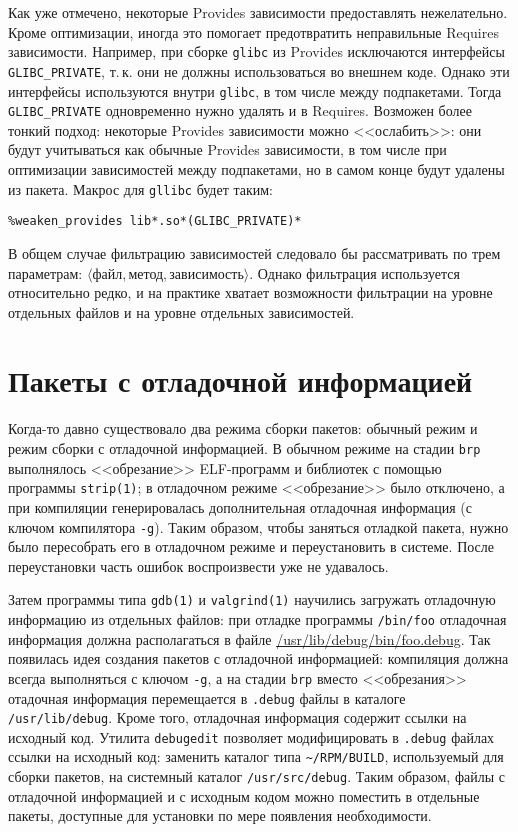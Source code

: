\documentclass[russian,a4paper,12pt,titlepage]{article}
\begin{document}
Как уже отмечено, некоторые Provides зависимости предоставлять нежелательно.  Кроме оптимизации, иногда это помогает
предотвратить неправильные Requires зависимости.  Например, при сборке \verb|glibc| из Provides исключаются интерфейсы
\verb|GLIBC_PRIVATE|, т.\,к. они не должны использоваться во внешнем коде.
Однако эти интерфейсы используются внутри \verb|glibc|, в том числе между подпакетами.  Тогда
\verb|GLIBC_PRIVATE| одновременно нужно удалять и в Requires.  Возможен более тонкий подход: некоторые Provides зависимости
можно <<ослабить>>: они будут учитываться как обычные Provides зависимости, в том числе при оптимизации зависимостей между
подпакетами, но в самом конце будут удалены из пакета.  Макрос для \verb|gllibc| будет таким:
\begin{verbatim}
%weaken_provides lib*.so*(GLIBC_PRIVATE)*
\end{verbatim}

В общем случае фильтрацию зависимостей следовало бы рассматривать по трем параметрам:
$\langle\textit{файл},\textit{метод},\textit{зависимость}\rangle$.  Однако фильтрация используется относительно редко,
и на практике хватает возможности фильтрации на уровне отдельных файлов и на уровне отдельных зависимостей.

\section{Пакеты с отладочной информацией}
\label{debuginfo-packages}
Когда-то давно существовало два режима сборки пакетов: обычный режим и режим сборки с отладочной информацией.
В обычном режиме на стадии \verb|brp| выполнялось <<обрезание>> ELF-программ и библиотек с помощью программы \verb|strip(1)|;
в отладочном режиме <<обрезание>> было отключено, а при компиляции генерировалась дополнительная отладочная информация (с ключом
компилятора \verb|-g|).  Таким образом, чтобы заняться отладкой пакета, нужно было пересобрать его в отладочном режиме и переустановить
в системе.  После переустановки часть ошибок воспроизвести уже не удавалось.

Затем программы типа \verb|gdb(1)| и \verb|valgrind(1)| научились загружать отладочную информацию из отдельных файлов:
при отладке программы \verb|/bin/foo| отладочная информация должна располагаться в файле \url{/usr/lib/debug/bin/foo.debug}.
Так появилась идея создания пакетов с отладочной информацией: компиляция должна всегда выполняться с ключом \verb|-g|,
а на стадии \verb|brp| вместо <<обрезания>> отадочная информация перемещается в \verb|.debug| файлы
в каталоге \verb|/usr/lib/debug|.  Кроме того, отладочная информация содержит ссылки на исходный код.
Утилита \verb|debugedit| позволяет модифицировать в \verb|.debug| файлах ссылки на исходный код: заменить каталог
типа \verb|~/RPM/BUILD|, используемый для сборки пакетов, на системный каталог \verb|/usr/src/debug|.  Таким образом,
файлы с отладочной информацией и с исходным кодом можно поместить в отдельные пакеты, доступные для установки
по мере появления необходимости.
\end{document}
